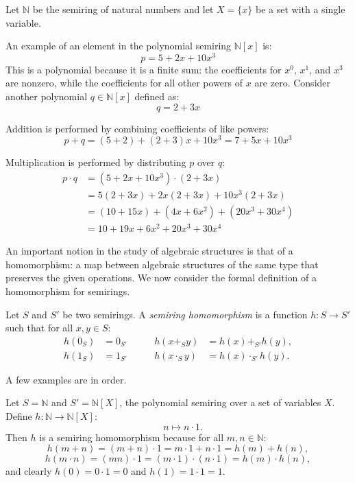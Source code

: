 \documentclass[oneside, 11pt]{amsbook}
\theoremstyle{plain}
\theoremstyle{definition}
\theoremstyle{remark}
\begin{document}
\begin{exmpl}
    Let $\mathbb{N}$ be the semiring of natural numbers and let $X = \{x\}$ be a set with a single variable.

    An example of an element in the polynomial semiring $\mathbb{N}[x]$ is:
    \[
        p = 5 + 2x + 10x^3
    \]
    This is a polynomial because it is a finite sum: the coefficients for $x^0$, $x^1$, and $x^3$ are nonzero, while the coefficients for all other powers of $x$ are zero. Consider another polynomial $q \in \mathbb{N}[x]$ defined as:
    \[
        q = 2 + 3x
    \]

    Addition is performed by combining coefficients of like powers:
    \[
        p + q = (5 + 2) + (2 + 3)x + 10x^3 = 7 + 5x + 10x^3
    \]

    Multiplication is performed by distributing $p$ over $q$:
    \[
        \begin{aligned}
            p \cdot q & = (5 + 2x + 10x^3) \cdot (2 + 3x)            \\
                      & = 5(2 + 3x) + 2x(2 + 3x) + 10x^3(2 + 3x)     \\
                      & = (10 + 15x) + (4x + 6x^2) + (20x^3 + 30x^4) \\
                      & = 10 + 19x + 6x^2 + 20x^3 + 30x^4
        \end{aligned}
    \]
\end{exmpl}

An important notion in the study of algebraic structures is that of a homomorphism: a map between algebraic structures of the same type that preserves the given operations. We now consider the formal definition of a homomorphism for semirings.

\begin{defn}
    Let $S$ and $S'$ be two semirings. A \emph{semiring homomorphism} is a function $h : S \to S'$ such that for all $x,y \in S$:
    \[
        \begin{aligned}
            h(0_S) & = 0_{S'} \qquad & h(x +_S y)     & = h(x) +_{S'} h(y),     \\
            h(1_S) & = 1_{S'} \qquad & h(x \cdot_S y) & = h(x) \cdot_{S'} h(y).
        \end{aligned}
    \]
\end{defn}

A few examples are in order.

\begin{exmpl}
    Let $S = \mathbb{N}$ and $S' = \mathbb{N}[X]$, the polynomial semiring over a set of variables $X$. Define $ h : \mathbb{N} \to \mathbb{N}[X]$:
    \[
        \quad n \mapsto n \cdot 1.
    \]
    Then $h$ is a semiring homomorphism because for all $m,n \in \mathbb{N}$:
    \[
        h(m+n) = (m+n)\cdot 1 = m\cdot 1 + n\cdot 1 = h(m) + h(n),
    \]
    \[
        h(m \cdot n) = (m n)\cdot 1 = (m \cdot 1) \cdot (n \cdot 1) = h(m) \cdot h(n),
    \]
    and clearly $h(0) = 0 \cdot 1 = 0$ and $h(1) = 1 \cdot 1 = 1$.
\end{exmpl}
\end{document}
